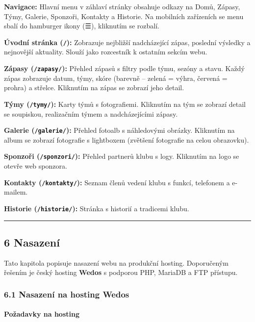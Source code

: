 \textbf{Navigace:} Hlavní menu v záhlaví stránky obsahuje odkazy na
Domů, Zápasy, Týmy, Galerie, Sponzoři, Kontakty a Historie. Na mobilních
zařízeních se menu sbalí do hamburger ikony (☰), kliknutím se rozbalí.

\textbf{Úvodní stránka (\texttt{/}):} Zobrazuje nejbližší nadcházející
zápas, poslední výsledky a nejnovější aktuality. Slouží jako rozcestník
k ostatním sekcím webu.

\textbf{Zápasy (\texttt{/zapasy/}):} Přehled zápasů s filtry podle týmu,
sezóny a stavu. Každý zápas zobrazuje datum, týmy, skóre (barevně --
zelená = výhra, červená = prohra) a střelce. Kliknutím na zápas se
zobrazí jeho detail.

\textbf{Týmy (\texttt{/tymy/}):} Karty týmů s fotografiemi. Kliknutím na
tým se zobrazí detail se soupiskou, realizačním týmem a nadcházejícími
zápasy.

\textbf{Galerie (\texttt{/galerie/}):} Přehled fotoalb s náhledovými
obrázky. Kliknutím na album se zobrazí fotografie s lightboxem (zvětšení
fotografie na celou obrazovku).

\textbf{Sponzoři (\texttt{/sponzori/}):} Přehled partnerů klubu s logy.
Kliknutím na logo se otevře web sponzora.

\textbf{Kontakty (\texttt{/kontakty/}):} Seznam členů vedení klubu s
funkcí, telefonem a e-mailem.

\textbf{Historie (\texttt{/historie/}):} Stránka s historií a tradicemi
klubu.

\begin{center}\rule{0.5\linewidth}{0.5pt}\end{center}

\subsection{6 Nasazení}\label{nasazenuxed}

Tato kapitola popisuje nasazení webu na produkční hosting. Doporučeným
řešením je český hosting \textbf{Wedos} s podporou PHP, MariaDB a FTP
přístupu.

\subsubsection{6.1 Nasazení na hosting
Wedos}\label{nasazenuxed-na-hosting-wedos}

\paragraph{Požadavky na hosting}\label{poux17eadavky-na-hosting}


